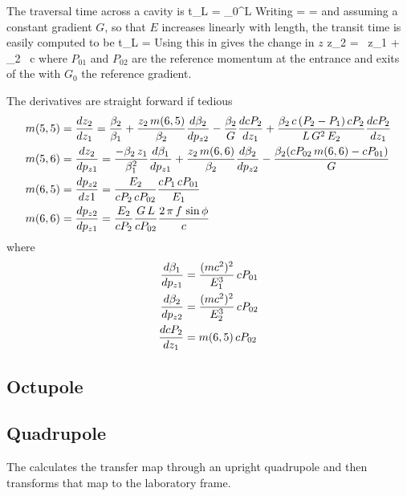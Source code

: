 \documentclass{book}
\begin{document}
The traversal time across a cavity is
\Begineq
  t_L = \int_0^L 
\Endeq
Writing
\Begineq
   =  = 
\Endeq
and assuming a constant gradient $G$, so that $E$ increases linearly
with length, the transit time is easily computed to be
\Begineq
  t_L = 
\Endeq
Using this in  gives the change in $z$
\Begineq
  z_2 =  \, z_1 + 
  \beta_2 \, c 
\Endeq
where $P_{01}$ and $P_{02}$ are the reference momentum at the entrance
and exits of the  with $G_0$ the reference gradient. 

The derivatives are straight forward if tedious
\begin{align}
  m(5,5) &= \frac{dz_2}{dz_1} = 
    \frac{\beta_2}{\beta_1} + 
    \frac{z_2 \, m(6,5)}{\beta_2} \frac{d\beta_2}{dp_{z2}} - 
    \frac{\beta_2}{G} \frac{dcP_2}{dz_1} +
    \frac{\beta_2 \, c \, (P_2 - P_1) \, c P_2}{L \, G^2 \, E_2} 
      \frac{dcP_2}{dz_1} \nonumber \\
  m(5,6) &= \frac{dz_2}{dp_{z1}} = 
    \frac{-\beta_2 \, z_1}{\beta_1^2} \frac{d\beta_1}{dp_{z1}} + 
    \frac{z_2 \, m(6,6)}{\beta_2} \frac{d\beta_2}{dp_{z2}} -
    \frac{\beta_2 ( c P_{02} \, m(6,6) - c P_{01})}{G} \nonumber \\
  m(6,5) &= \frac{dp_{z2}}{dz1} =
    \frac{E_2}{cP_2 \, cP_{02}} \frac{cP_1 \, cP_{01}}{E_1}  \\
  m(6,6) &= \frac{dp_{z2}}{dp_{z1}} = 
    \frac{E_2}{cP_2} \frac{G \, L}{c P_{02}} \frac{2 \, \pi \, f \, \sin\phi}{c}
    \nonumber
\end{align}
where
\begin{align}
  \frac{d\beta_1}{dp_{z1}}  &= \frac{(mc^2)^2}{E_1^3} \, cP_{01} \nonumber \\
  \frac{d\beta_2}{dp_{z2}}  &= \frac{(mc^2)^2}{E_2^3} \, cP_{02} \\
  \frac{dcP_2}{dz_1}        &= m(6,5) \, cP_{02}  \nonumber
\end{align}

\subsection{Octupole}

\subsection{Quadrupole}

The  calculates the transfer map through an upright
quadrupole and then transforms that map to the laboratory frame.
\end{document}
